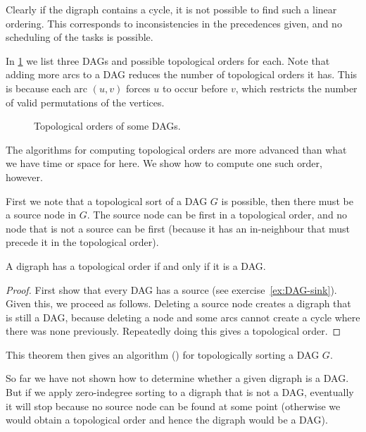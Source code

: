 Clearly if the digraph contains a cycle, it is not possible to find
such a linear ordering. This corresponds to inconsistencies in the
precedences given, and no scheduling of the tasks is possible.

\begin{Example}
\label{eg:toporder}
In \cref{fig:toporder} we list three DAGs and possible topological
orders for each. Note that adding more arcs to a DAG  reduces the number
of topological orders it has.  This is because each arc $(u,v)$ forces
$u$ to occur before $v$, which restricts the number of valid permutations
of the vertices.
\end{Example}

\begin{figure}

\caption{Topological orders of some DAGs.}
\label{fig:toporder}
\end{figure}

The algorithms for computing  topological orders are
more advanced than what we have time or space for here. We show how to
compute one such order, however.

First we note that  a topological sort of a DAG $G$
is possible, then there must be a source node in $G$. The source
node can be first in a topological order, and no node that is not
a source can be first (because it has an in-neighbour that must
precede it in the topological order).


\begin{Theorem}
\label{thm:topDAG}
A digraph has a topological order if and only if it is a DAG.
\end{Theorem}

\begin{proof} 
First show that every DAG has a source (see
exercise~\ref{ex:DAG-sink}).  Given this, we proceed as follows. Deleting
a source node creates a digraph that is still a DAG, because deleting
a node and some arcs cannot create a cycle where there was none
previously. Repeatedly doing this gives a topological order.
\end{proof}

This theorem then gives an algorithm ()
for topologically sorting a DAG $G$.

So far we have not shown how to determine whether a given digraph is
a DAG. But if we apply zero-indegree sorting to a digraph that is not
a DAG, eventually it will stop because no source node can be found at
some point (otherwise we would obtain a topological order and hence the
digraph would be a DAG).

